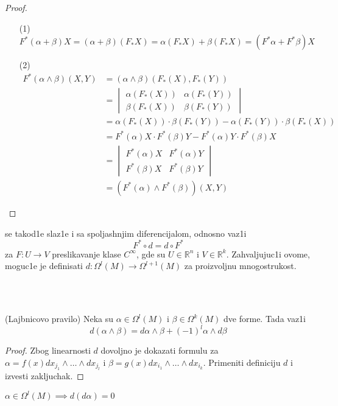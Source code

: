 \documentclass[a4paper,12pt]{article}
\newcommand{\latin}{\fontencoding{T1}\selectfont}
\newcommand{\RR}{\mathbb{R}}
\begin{document}
\begin{proof}
\begin{itemize}
\item[(1)] $F^*(\alpha + \beta) X = (\alpha + \beta) (F_* X) = \alpha(F_* X) + \beta(F_* X) = (F^* \alpha + F^* \beta) X$
\item[(2)]
\begin{align*}
 F^* (\alpha \wedge \beta) (X,Y) &= (\alpha \wedge \beta) (F_* (X), F_* (Y)) \\
 &= \begin{vmatrix} \alpha(F_*(X)) & \alpha(F_*(Y)) \\ \beta(F_*(X)) & \beta(F_*(Y)) \end{vmatrix} \\
 &= \alpha(F_*(X))\cdot \beta(F_*(Y)) - \alpha(F_*(Y)) \cdot \beta(F_*(X)) \\
 &= F^*(\alpha) X \cdot F^*(\beta) Y - F^*(\alpha) Y \cdot F^*(\beta) X \\
 &=  \begin{vmatrix} F^*(\alpha)X & F^*(\alpha)Y \\ F^*(\beta)X & F^*(\beta)Y \end{vmatrix} \\
 &= (F^*(\alpha) \wedge F^*(\beta))(X,Y)
\end{align*}
\end{itemize}
\end{proof}

\begin{nap} \latin{Pullback} \selectfont se takod1e slaz1e i sa spoljashnjim diferencijalom, odnosno vaz1i \[F^* \circ d  = d \circ F^* \]
za $F: U \to V$ preslikavanje klase $C^{\infty}$, gde su $U \in \RR^n$ i $V \in \RR^k$.
 Zahvaljujuc1i ovome, moguc1e je definisati $d: \Omega^l(M) \to \Omega^{l+1}(M)$ za proizvoljnu mno\-go\-stru\-kost. 
\end{nap}
\\ \\

\begin{tvr} (Lajbnicovo pravilo)
Neka su $\alpha \in \Omega^l(M)$ i $\beta \in \Omega^k(M)$ dve forme. Tada vaz1i 
\[d(\alpha \wedge \beta) = d \alpha \wedge \beta + (-1)^l \alpha \wedge d \beta \]
\end{tvr}
\begin{proof}
Zbog linearnosti $d$ dovoljno je dokazati formulu za $\alpha = f(x) dx_{j_1} \wedge \dots \wedge dx_{j_l}$ i $\beta = g(x) dx_{i_1} \wedge \dots \wedge dx_{i_k}$. Primeniti definiciju $d$ i izvesti zakljuchak.
\end{proof}

\begin{tma} 
$\alpha \in \Omega^l(M) \implies d(d \alpha) = 0$
\end{tma}
\end{document}
